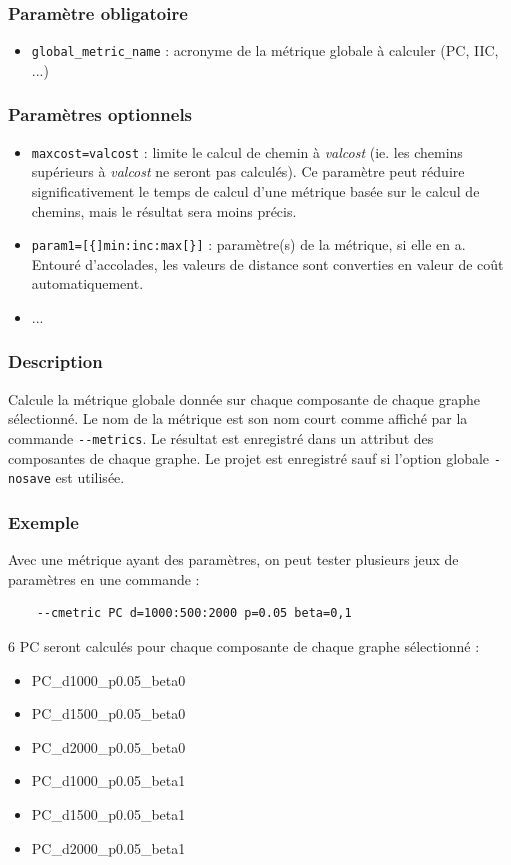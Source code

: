 \documentclass[a4paper,10pt]{report}
\begin{document}
\subsubsection{Paramètre obligatoire}
\begin{itemize}
	\item \verb|global_metric_name| : acronyme de la métrique globale à calculer (PC, IIC, ...)
\end{itemize}

\subsubsection{Paramètres optionnels}
\begin{itemize}
	\item \verb|maxcost=valcost| : limite le calcul de chemin à \textit{valcost} (ie. les chemins supérieurs à \textit{valcost} ne seront pas calculés). Ce paramètre peut réduire significativement le temps de calcul d'une métrique basée sur le calcul de chemins, mais le résultat sera moins précis.
	\item \verb|param1=[{]min:inc:max[}]| : paramètre(s) de la métrique, si elle en a. Entouré d'accolades, les valeurs de distance sont converties en valeur de coût automatiquement.
	\item ...
\end{itemize}

\subsubsection{Description}
Calcule la métrique globale donnée sur chaque composante de chaque graphe sélectionné.
Le nom de la métrique est son nom court comme affiché par la commande \verb|--metrics|.
Le résultat est enregistré dans un attribut des composantes de chaque graphe. Le projet est enregistré sauf si l'option globale \verb|-nosave| est utilisée.

\subsubsection{Exemple}
Avec une métrique ayant des paramètres, on peut tester plusieurs jeux de paramètres en une commande :
\begin{Verbatim}
	--cmetric PC d=1000:500:2000 p=0.05 beta=0,1
\end{Verbatim}
6 PC seront calculés pour chaque composante de chaque graphe sélectionné :
\begin{itemize}
 \item PC\_d1000\_p0.05\_beta0
 \item PC\_d1500\_p0.05\_beta0
 \item PC\_d2000\_p0.05\_beta0
 \item PC\_d1000\_p0.05\_beta1
 \item PC\_d1500\_p0.05\_beta1
 \item PC\_d2000\_p0.05\_beta1
\end{itemize}
\end{document}
